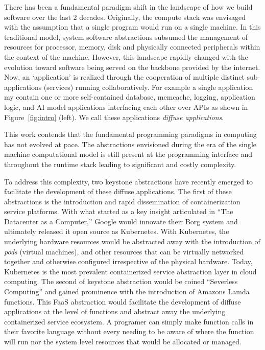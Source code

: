 There has been a fundamental paradigm shift in the landscape of how we build software over the last 2 decades.
Originally, the compute stack was envisaged with the assumption that a single program would run on a single machine.
In this traditional model, system software abstractions subsumed the management of resources for processor, memory, disk and physically connected peripherals within the context of the machine.
However, this landscape rapidly changed with the evolution toward software being served on the backbone provided by the internet.
Now, an `application' is realized through the cooperation of multiple distinct sub-applications (services) running collaboratively.
For example a single application my contain one or more self-contained database, memcache, logging, application logic, and AI model applications interfacing each other over APIs as shown in Figure~\ref{fig:intro} (left).
We call these applications \emph{diffuse applications}.


This work contends that the fundamental programming paradigms in computing has not evolved at pace.
The abstractions envisioned during the era of the single machine computational model is still present at the programming interface and throughout the runtime stack leading to significant and costly complexity.


To address this complexity, two keystone abstractions have recently emerged to facilitate the development of these diffuse applications.
The first of these abstractions is the introduction and rapid dissemination of containerization service platforms.
With what started as a key insight articulated in ``The Datacenter as a Computer,'' Google would innovate their Borg system and ultimately released it open source as Kubernetes.
With Kubernetes, the underlying hardware resources would be abstracted away with the introduction of \emph{pods} (virtual machines), and other resources that can be virtually networked together and otherwise configured irrespective of the physical hardware.
Today, Kubernetes is the most prevalent containerized service abstraction layer in cloud computing.
The second of keystone abstraction would be coined ``Severless Computing'' and gained prominence with the introduction of Amazons Lamda functions.
This FaaS abstraction would facilitate the development of diffuse applications at the level of functions and abstract away the underlying containerized service ecosystem.
A programer can simply make function calls in their favorite language without every needing to be aware of where the function will run nor the system level resources that would be allocated or managed.


